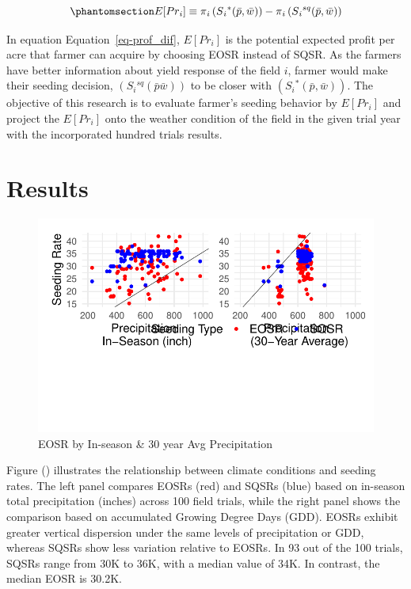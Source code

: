 \documentclass[
]{article}
\begin{document}
\begin{equation}\phantomsection\label{eq-prof_dif}{
   E[Pr{_i}]  \equiv  \pi{_i} \left(S{_i}^{*}(\bar{p}, \bar{w})\right) -  \pi{_i} \left(S{_i}^{sq}(\bar{p}, \bar{w})\right)
}\end{equation}

In equation Equation~\ref{eq-prof_dif}, \(E[Pr{_i}]\) is the potential
expected profit per acre that farmer can acquire by choosing EOSR
instead of SQSR. As the farmers have better information about yield
response of the field \(i\), farmer would make their seeding decision,
\(\left(S{_i}^{sq}(\bar{p} \bar{w})\right)\) to be closer with
\(\left(S{_i}^*(\bar{p}, \bar{w})\right)\). The objective of this
research is to evaluate farmer's seeding behavior by \(E[Pr{_i}]\) and
project the \(E[Pr{_i}]\) onto the weather condition of the field in the
given trial year with the incorporated hundred trials results.

\section{Results}\label{results}

\begin{figure}[H]

{\centering \includegraphics[width=17.1875in,height=\textheight]{corn_seed_response_writing_files/figure-pdf/fig3-eosr-sqsr-weather-1.pdf}

}

\caption{EOSR by In-season \& 30 year Avg Precipitation}

\end{figure}%

Figure
()
illustrates the relationship between climate conditions and seeding
rates. The left panel compares EOSRs (red) and SQSRs (blue) based on
in-season total precipitation (inches) across 100 field trials, while
the right panel shows the comparison based on accumulated Growing Degree
Days (GDD). EOSRs exhibit greater vertical dispersion under the same
levels of precipitation or GDD, whereas SQSRs show less variation
relative to EOSRs. In 93 out of the 100 trials, SQSRs range from 30K to
36K, with a median value of 34K. In contrast, the median EOSR is 30.2K.
\end{document}
